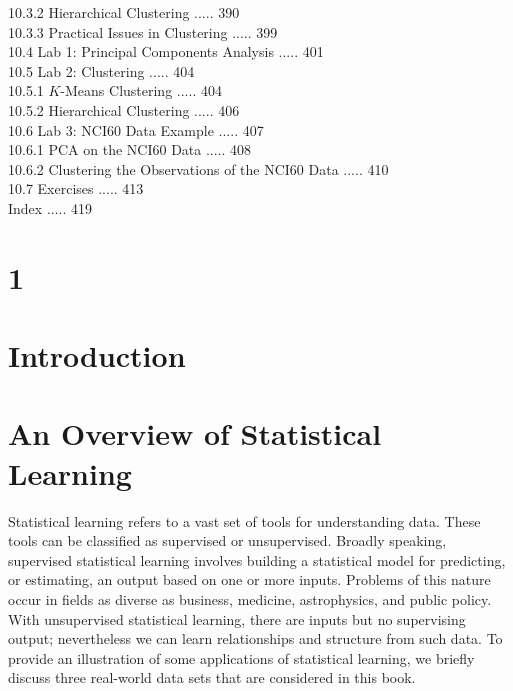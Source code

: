 \documentclass[10pt]{article}
\begin{document}
10.3.2 Hierarchical Clustering ..... 390\\
10.3.3 Practical Issues in Clustering ..... 399\\
10.4 Lab 1: Principal Components Analysis ..... 401\\
10.5 Lab 2: Clustering ..... 404\\
10.5.1 $K$-Means Clustering ..... 404\\
10.5.2 Hierarchical Clustering ..... 406\\
10.6 Lab 3: NCI60 Data Example ..... 407\\
10.6.1 PCA on the NCI60 Data ..... 408\\
10.6.2 Clustering the Observations of the NCI60 Data ..... 410\\
10.7 Exercises ..... 413\\
Index ..... 419

\section*{1}
\section*{Introduction}
\section*{An Overview of Statistical Learning}
Statistical learning refers to a vast set of tools for understanding data. These tools can be classified as supervised or unsupervised. Broadly speaking, supervised statistical learning involves building a statistical model for predicting, or estimating, an output based on one or more inputs. Problems of this nature occur in fields as diverse as business, medicine, astrophysics, and public policy. With unsupervised statistical learning, there are inputs but no supervising output; nevertheless we can learn relationships and structure from such data. To provide an illustration of some applications of statistical learning, we briefly discuss three real-world data sets that are considered in this book.
\end{document}
